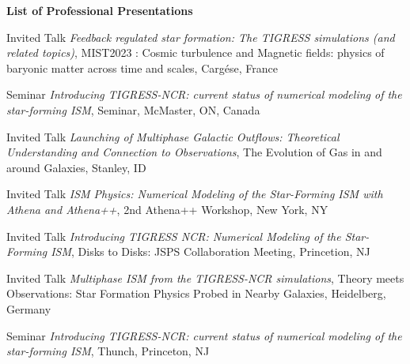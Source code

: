 \documentclass[12pt]{article}
\begin{document}



\begin{itemize}[itemsep=0pt,topsep=\parskip]
\small 
\end{itemize}


\begin{center}
{\large \bf List of Professional Presentations}
\end{center}


{Invited Talk}
{\emph{Feedback regulated star formation: The TIGRESS simulations (and related topics)},
MIST2023 : Cosmic turbulence and Magnetic fields: physics of baryonic matter across time and scales,
Carg\'ese, France}

{Seminar}
{\emph{Introducing TIGRESS-NCR: current status of numerical modeling of the star-forming ISM},
Seminar,
McMaster, ON, Canada}

{Invited Talk}
{\emph{Launching of Multiphase Galactic Outflows: Theoretical Understanding and Connection to Observations},
The Evolution of Gas in and around Galaxies,
Stanley, ID}

{Invited Talk}
{\emph{ISM Physics: Numerical Modeling of the Star-Forming ISM with Athena and Athena++},
2nd Athena++ Workshop,
New York, NY}

{Invited Talk}
{\emph{Introducing TIGRESS NCR: Numerical Modeling of the Star-Forming ISM},
Disks to Disks: JSPS Collaboration Meeting,
Princetion, NJ}

{Invited Talk}
{\emph{Multiphase ISM from the TIGRESS-NCR simulations},
Theory meets Observations: Star Formation Physics Probed in Nearby Galaxies,
Heidelberg, Germany}

{Seminar}
{\emph{Introducing TIGRESS-NCR: current status of numerical modeling of the star-forming ISM},
Thunch,
Princeton, NJ}
\end{document}
